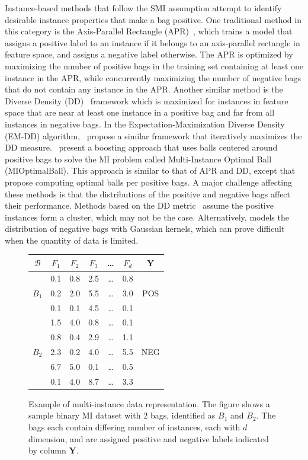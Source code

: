 Instance-based methods that follow the SMI assumption attempt to identify desirable instance properties that make a bag positive. One traditional method in this category is the Axis-Parallel Rectangle (APR)~\citep{Dietterich1997}, which trains a model that assigns a positive label to an instance if it belongs to an axis-parallel rectangle in feature space, and assigns a negative label otherwise. The APR is optimized by maximizing the number of positive bags in the training set containing at least one instance in the APR, while concurrently maximizing the number of negative bags that do not contain any instance in the APR. Another similar method is the Diverse Density (DD)~\citep{Maron1998} framework which is maximized for instances in feature space that are near at least one instance in a positive bag and far from all instances in negative bags. In the Expectation-Maximization Diverse Density (EM-DD) algorithm,~\cite{Zhang2001} propose a similar framework that iteratively maximizes the DD measure.~\cite{Auer2004} present a boosting approach that uses balls centered around positive bags to solve the MI problem called Multi-Instance Optimal Ball (MIOptimalBall). This approach is similar to that of APR and DD, except that~\cite{Auer2004} propose computing optimal balls per positive bags. A major challenge affecting these methods is that the distributions of the positive and negative bags affect their performance. Methods based on the DD metric~\citep{Chen2004,Chen2006,Carbonneau2016,qi2007} assume the positive instances form a cluster, which may not be the case. Alternatively, \cite{Fu2011} models the distribution of negative bags with Gaussian kernels, which can prove difficult when the quantity of data is limited. 
\begin{figure}
\centering
\begin{tabular}{|c|ccccc|c|}
\hline
$\mathcal{B}$ & $F_1$ & $F_2$ & $F_3$ & \ldots & $F_d$ & $\bm Y$ \\        
\hline
    	  & 0.1 & 0.8 & 2.5 & \ldots & 0.8 &    \\        
    $B_1$ 	  & 0.2 & 2.0 & 5.5 & \ldots & 3.0 & POS \\
    	  & 0.1 & 0.1   & 4.5 & \ldots & 0.1 &    \\
\hline
    	  & 1.5 & 4.0 & 0.8 & \ldots & 0.1 &    \\
    	  & 0.8 & 0.4 & 2.9 & \ldots & 1.1 &    \\
    $B_2$	  & 2.3 & 0.2 & 4.0 & \ldots & 5.5 & NEG \\
    	  & 6.7 & 5.0 & 0.1  & \ldots & 0.5 &    \\
    	  & 0.1 & 4.0 & 8.7 & \ldots & 3.3 &    \\
\hline
  \end{tabular}
  \caption{Example of multi-instance data representation. The figure shows a sample binary MI dataset with $2$ bags, identified as $B_1$ and $B_2$. The bags each contain differing number of instances, each with $d$ dimension, and are assigned positive and negative labels indicated by column $\bm Y$.}%
  \label{fig:mirep}%
\end{figure}

